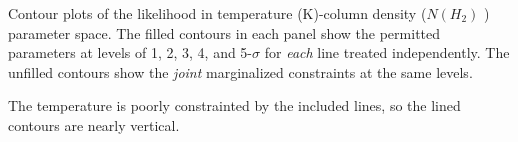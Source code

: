 Contour plots of the likelihood in temperature (K)-column
density ($N(H_2)$ \persc) parameter space.  The filled contours in each panel
show the permitted parameters at levels of 1, 2, 3, 4, and 5-$\sigma$ for
\emph{each} line treated independently.  The unfilled contours show the
\emph{joint} marginalized constraints at the same levels.

The temperature is poorly constrainted by the included \cyano lines, 
so the lined contours are nearly vertical. 
